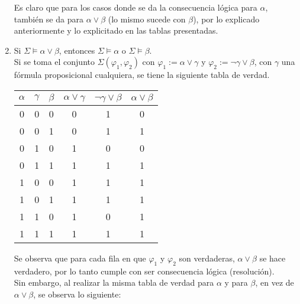 \documentclass[letter]{article}
\begin{document}
\begin{pregunta}{2}
\begin{enumerate}
			Es claro que para los casos donde se da la consecuencia lógica para $\alpha$, también se da para $\alpha \vee \beta$ (lo mismo sucede con $\beta$), por lo explicado anteriormente y lo explicitado en las tablas presentadas.\\
			
		\item
			Si $\Sigma \models \alpha \vee \beta$, entonces $\Sigma \models \alpha$ o $\Sigma \models \beta$.\\
			
			Si se toma el conjunto $\Sigma(\varphi_1, \varphi_2)$ con $\varphi_1:=\alpha \vee \gamma$ y $\varphi_2:=\neg \gamma \vee \beta $, con $\gamma$ una fórmula proposicional cualquiera, se tiene la siguiente tabla de verdad.
			
			\begin{center}
				\begin{tabular}{ ccc|cc|c } 
				$\alpha$ & $\gamma$ & $\beta$ & $\alpha \vee \gamma$ & $\neg \gamma \vee \beta $ & $\alpha \vee \beta$\\
				\hline
				0 & 0 & 0 & 0 & 1 & 0\\
				0 & 0 & 1 & 0 & 1 & 1\\
				0 & 1 & 0 & 1 & 0 & 0\\
				\rowcolor{lightblue} 0 & 1 & 1 & 1 & 1 & 1\\
				\rowcolor{lightblue} 1 & 0 & 0 & 1 & 1 & 1\\
				\rowcolor{lightblue} 1 & 0 & 1 & 1 & 1 & 1\\
				1 & 1 & 0 & 1 & 0 & 1\\
				\rowcolor{lightblue} 1 & 1 & 1 & 1 & 1 & 1
				\end{tabular}
			\end{center}
			
			Se observa que para cada fila en que $\varphi_1$ y $\varphi_2$ son verdaderas, $\alpha \vee \beta$ se hace verdadero, por lo tanto cumple con ser consecuencia lógica (resolución).\\
			
			Sin embargo, al realizar la misma tabla de verdad para $\alpha$ y para $\beta$, en vez de $\alpha \vee \beta$, se observa lo siguiente:
			

\end{enumerate}
\end{pregunta}
\end{document}
